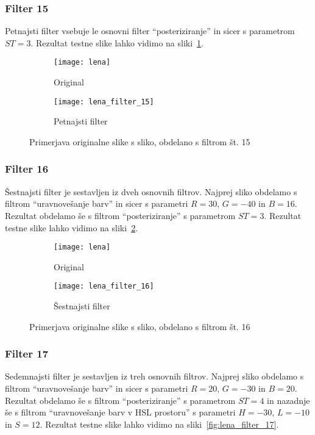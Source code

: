 \subsubsection*{Filter 15}
Petnajsti filter vsebuje le osnovni filter ``posteriziranje'' in sicer s parametrom
$ST = 3$. Rezultat testne slike lahko vidimo na sliki~\ref{fig:lena_filter_15}.

\begin{figure}[!ht]
    \centering
    \begin{subfigure}[b]{0.4\textwidth}
        \texttt{[image: lena]}
        \caption{Original}
    \end{subfigure}
    \begin{subfigure}[b]{0.4\textwidth}
        \texttt{[image: lena\_filter\_15]}
        \caption{Petnajsti filter}
    \end{subfigure}
    \caption{Primerjava originalne slike s sliko, obdelano s filtrom št. 15}
    \label{fig:lena_filter_15}
\end{figure}


\subsubsection*{Filter 16}
Šestnajsti filter je sestavljen iz dveh osnovnih filtrov. Najprej sliko obdelamo s
filtrom ``uravnovešanje barv'' in sicer s parametri $R = 30$, $G = -40$ in
$B = 16$. Rezultat obdelamo še s filtrom ``posteriziranje'' s parametrom
$ST =3$. Rezultat testne slike lahko vidimo na sliki~\ref{fig:lena_filter_16}.

\begin{figure}[!ht]
    \centering
    \begin{subfigure}[b]{0.4\textwidth}
        \texttt{[image: lena]}
        \caption{Original}
    \end{subfigure}
    \begin{subfigure}[b]{0.4\textwidth}
        \texttt{[image: lena\_filter\_16]}
        \caption{Šestnajsti filter}
    \end{subfigure}
    \caption{Primerjava originalne slike s sliko, obdelano s filtrom št. 16}
    \label{fig:lena_filter_16}
\end{figure}


\subsubsection*{Filter 17}
Sedemnajsti filter je sestavljen iz treh osnovnih filtrov. Najprej sliko obdelamo s
filtrom ``uravnovešanje barv'' in sicer s parametri $R = 20$, $G = -30$ in
$B = 20$. Rezultat obdelamo še s filtrom ``posteriziranje'' s parametrom
$ST= 4$ in nazadnje še s filtrom ``uravnovešanje barv v HSL prostoru'' s
parametri $H = -30$, $L = -10$ in $S = 12$. Rezultat testne slike lahko
vidimo na sliki~\ref{fig:lena_filter_17}.

